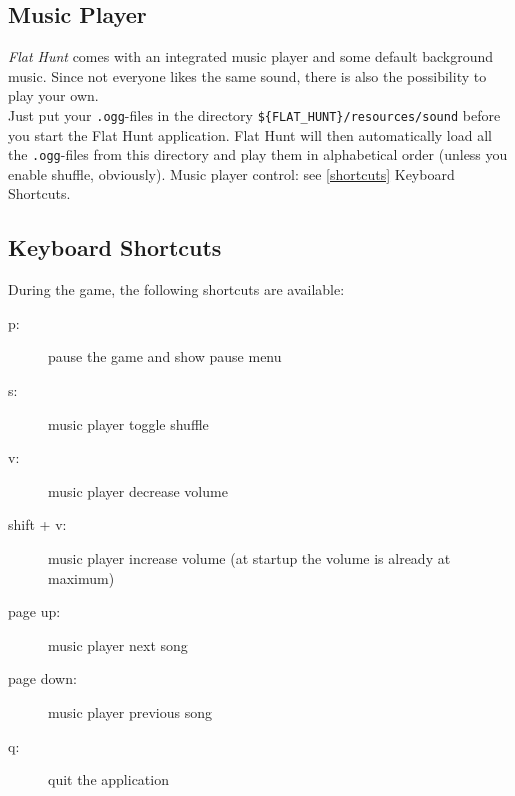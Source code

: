 \subsection{Music Player}
\emph{Flat Hunt} comes with an integrated music player and some default background music. Since not everyone likes the same sound, there is also the possibility to play your own.\\ 
Just put your \texttt{.ogg}-files in the directory \texttt{\$\{FLAT\_HUNT\}/resources/sound} before you start the Flat Hunt application. Flat Hunt will then automatically load all the \texttt{.ogg}-files from this directory and play them in alphabetical order (unless you enable shuffle, obviously). Music player control: see \ref{shortcuts} Keyboard Shortcuts.

\subsection{\label{shortcuts}Keyboard Shortcuts}

During the game, the following shortcuts are available:

  \begin{description}
    \item[p:] pause the game and show pause menu
    \item[s:] music player toggle shuffle
    \item[v:] music player decrease volume
    \item[shift + v:] music player increase volume (at startup the volume is already at maximum)
    \item[page up:] music player next song
    \item[page down:] music player previous song
    \item[q:] quit the application
  \end{description}
